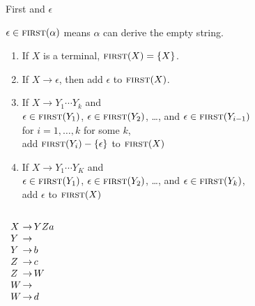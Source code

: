 \documentclass{plt}
\begin{document}
\begin{frame}{First and $\epsilon$}

\footnotesize
  $\epsilon \in \textsc{first}(\alpha)$ means $\alpha$ can derive the empty
  string.

  \begin{enumerate}
\item If $X$ is a terminal, $\textsc{first}(X) = \{ X \}$.

\item If $X \rightarrow \epsilon$, then add $\epsilon$ to $\textsc{first}(X)$.

\item If $X \rightarrow Y_1 \cdots Y_k$ and \\
  $\epsilon \in \textsc{first}(Y_1)$,
  $\epsilon \in \textsc{first}(Y_2)$, \ldots, and $\epsilon \in
  \textsc{first}(Y_{i-1})$ \\ for $i=1,\ldots, k$ for some $k$, \\ \quad add
  $\textsc{first}(Y_i) - \{ \epsilon \}$ to $\textsc{first}(X)$

\item If $X \rightarrow Y_1 \cdots Y_K$ and \\
  $\epsilon \in \textsc{first}(Y_1)$,
  $\epsilon \in \textsc{first}(Y_2)$, \ldots, and $\epsilon \in \textsc{first}(Y_k)$, \\ \quad add
  $\epsilon$ to $\textsc{first}(X)$
      \end{enumerate}

  \begin{columns}
    \begin{column}{0.15\textwidth}
      $\begin{array}{l@{\,}l@{\,}l}
        X & \rightarrow & Y Z a \\
        Y & \rightarrow & \\
        Y & \rightarrow & b \\
        Z & \rightarrow & c \\
        Z & \rightarrow & W \\
        W & \rightarrow & \\
        W & \rightarrow & d \\
      \end{array}$
    \end{column}
\end{columns}
\end{frame}
\end{document}
